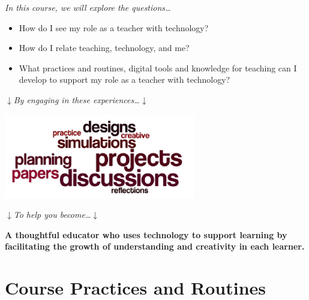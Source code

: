 \documentclass{tufte-handout}
\begin{document}
\begin{center}
	\large\textit{In this course, we will explore the questions\ldots}
\end{center}
\begin{framed}
	\small
	\begin{itemize}
		\item How do I see my role as a teacher with technology?
		\item How do I relate teaching, technology, and me?
		\item What practices and routines, digital tools and knowledge for teaching can I develop to support my role as a teacher with technology?
	\end{itemize}
\end{framed}
\begin{center}
	\large$\downarrow$\hspace{0.5em}\textit{By engaging in these experiences\ldots}\hspace{0.5em}$\downarrow$
\end{center}
\begin{framed}
	\begin{center}
		\includegraphics[width=0.45\linewidth]{experiences.png}
	\end{center}
\end{framed}
\begin{center}
	\large$\downarrow$\hspace{0.5em}\textit{To help you become\ldots}\hspace{0.5em}$\downarrow$
\end{center}

\begin{framed}
	\begin{center}
		\small\noindent\textbf{A thoughtful educator who uses technology to support learning by facilitating the growth of understanding and creativity in each learner.}
	\end{center}
\end{framed}

\normalsize

\newpage

\part{Course Practices and Routines}
\end{document}
